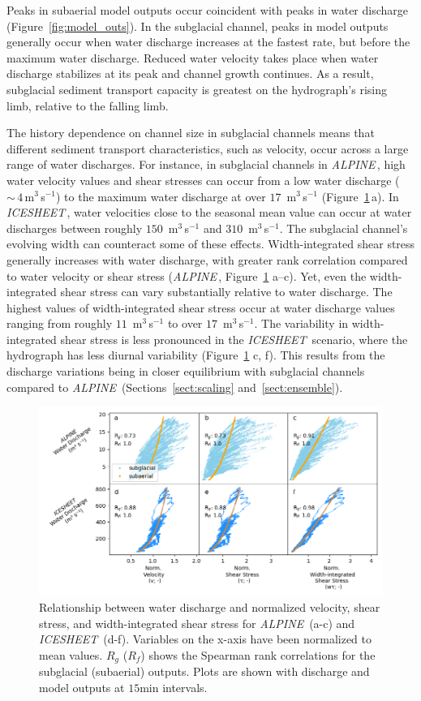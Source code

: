 \documentclass[tc, manuscript]{copernicus}
\newcommand{\alpine}{\textit{ALPINE}\,}
\newcommand{\icesheet}{\textit{ICESHEET}\,}
\begin{document}
Peaks in subaerial model outputs occur coincident with peaks in water discharge (Figure~\ref{fig:model_outs}).
In the subglacial channel, peaks in model outputs generally occur when water discharge increases at the fastest rate, but before the maximum water discharge.
Reduced water velocity takes place when water discharge stabilizes at its peak and channel growth continues.
As a result, subglacial sediment transport capacity is greatest on the hydrograph's rising limb, relative to the falling limb. 

The history dependence on channel size in subglacial channels means that different sediment transport characteristics, such as velocity, occur across a large range of water discharges.
For instance, in subglacial channels in \alpine{},  high water velocity values and shear stresses can occur from a low water discharge  ($\sim\,4$\,\unit{m}$^3$\,\unit{s}$^{-1}$) to the maximum water discharge at over $17$ \,\unit{m}$^3$\,\unit{s}$^{-1}$ (Figure~\ref{fig:Qw_vari}\,a).
In \icesheet{}, water velocities close to the seasonal mean value can occur at water discharges between roughly $150$ \,\unit{m}$^3$\,\unit{s}$^{-1}$ and $310$ \,\unit{m}$^3$\,\unit{s}$^{-1}$.
The subglacial channel's evolving width can counteract some of these effects.
Width-integrated shear stress generally increases with water discharge, with greater rank correlation compared to water velocity or shear stress (\alpine{}, Figure~\ref{fig:Qw_vari} a--c).
Yet, even the width-integrated shear stress can vary substantially relative to water discharge.
The highest values of width-integrated shear stress occur at water discharge values ranging from roughly $11$ \,\unit{m}$^3$\,\unit{s}$^{-1}$ to over $17$ \,\unit{m}$^3$\,\unit{s}$^{-1}$.
The variability in width-integrated shear stress is less pronounced in the \icesheet{} scenario, where the hydrograph has less diurnal variability (Figure~\ref{fig:Qw_vari} c, f).
This results from the discharge variations being in closer equilibrium with subglacial channels compared to \alpine{} (Sections~\ref{sect:scaling} and~\ref{sect:ensemble}).

\begin{figure}[hbt!]
  \centering
  \includegraphics[width=0.8\linewidth]{Fig6.png}
  \caption{
    Relationship between water discharge and normalized velocity, shear stress, and width-integrated shear stress for \alpine{} (a-c) and \icesheet{} (d-f).
    Variables on the x-axis have been normalized to mean values.
    $R_g$ ($R_f$) shows the Spearman rank correlations for the subglacial (subaerial) outputs.
    Plots are shown with discharge and model outputs at $15$\unit{min} intervals.
  }
  \label{fig:Qw_vari}
\end{figure}
\end{document}
